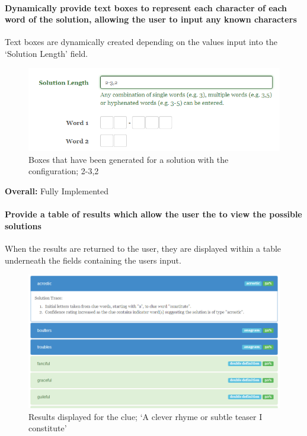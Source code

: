 \paragraph{Dynamically provide text boxes to represent each character of each
word of the solution, allowing the user to input any known characters}

Text boxes are dynamically created depending on the values input into the
`Solution Length' field.

\begin{figure}[H]
	\centering
	\includegraphics[scale=0.6]{evidence/dynamicboxes.png}
	\caption{Boxes that have been generated for a solution with the configuration;
	2-3,2}
\end{figure}

{\bf Overall:} Fully Implemented


\paragraph{Provide a table of results which allow the user the to view the
possible solutions}

When the results are returned to the user, they are displayed within a table
underneath the fields containing the users input.

\begin{figure}[H]
	\centering
	\includegraphics[scale=0.6]{evidence/listsolutions.png}
	\caption{Results displayed for the clue; `A clever rhyme or subtle teaser I constitute'}
\end{figure}

